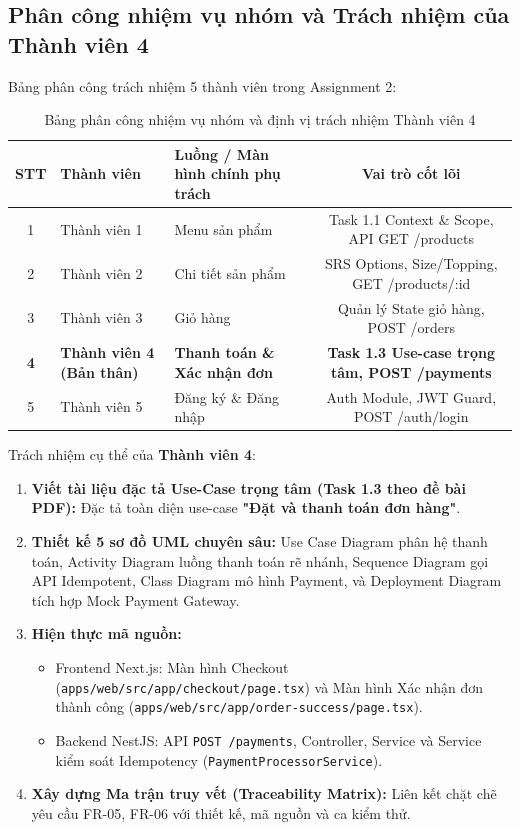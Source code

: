 \documentclass[a4paper]{article}
\begin{document}
\subsection{Phân công nhiệm vụ nhóm và Trách nhiệm của Thành viên 4}
Bảng phân công trách nhiệm 5 thành viên trong Assignment 2:
\begin{table}[h!]
\centering
\small
\begin{tabular}{|c|l|l|c|}
\hline
\textbf{STT} & \textbf{Thành viên} & \textbf{Luồng / Màn hình chính phụ trách} & \textbf{Vai trò cốt lõi} \\ \hline
1 & Thành viên 1 & Menu sản phẩm & Task 1.1 Context \& Scope, API GET /products \\ \hline
2 & Thành viên 2 & Chi tiết sản phẩm & SRS Options, Size/Topping, GET /products/:id \\ \hline
3 & Thành viên 3 & Giỏ hàng & Quản lý State giỏ hàng, POST /orders \\ \hline
\textbf{4} & \textbf{Thành viên 4 (Bản thân)} & \textbf{Thanh toán \& Xác nhận đơn} & \textbf{Task 1.3 Use-case trọng tâm, POST /payments} \\ \hline
5 & Thành viên 5 & Đăng ký \& Đăng nhập & Auth Module, JWT Guard, POST /auth/login \\ \hline
\end{tabular}
\caption{Bảng phân công nhiệm vụ nhóm và định vị trách nhiệm Thành viên 4}
\end{table}

Trách nhiệm cụ thể của \textbf{Thành viên 4}:
\begin{enumerate}
    \item \textbf{Viết tài liệu đặc tả Use-Case trọng tâm (Task 1.3 theo đề bài PDF):} Đặc tả toàn diện use-case \textbf{"Đặt và thanh toán đơn hàng"}.
    \item \textbf{Thiết kế 5 sơ đồ UML chuyên sâu:} Use Case Diagram phân hệ thanh toán, Activity Diagram luồng thanh toán rẽ nhánh, Sequence Diagram gọi API Idempotent, Class Diagram mô hình Payment, và Deployment Diagram tích hợp Mock Payment Gateway.
    \item \textbf{Hiện thực mã nguồn:}
    \begin{itemize}
        \item Frontend Next.js: Màn hình Checkout (\texttt{apps/web/src/app/checkout/page.tsx}) và Màn hình Xác nhận đơn thành công (\texttt{apps/web/src/app/order-success/page.tsx}).
        \item Backend NestJS: API \texttt{POST /payments}, Controller, Service và Service kiểm soát Idempotency (\texttt{PaymentProcessorService}).
    \end{itemize}
    \item \textbf{Xây dựng Ma trận truy vết (Traceability Matrix):} Liên kết chặt chẽ yêu cầu FR-05, FR-06 với thiết kế, mã nguồn và ca kiểm thử.
\end{enumerate}
\end{document}
